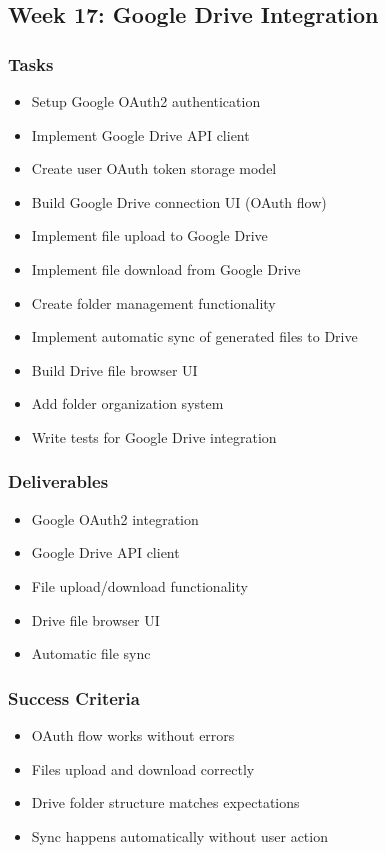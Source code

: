 \documentclass[12pt,oneside]{report}
\begin{document}
\subsection{Week 17: Google Drive Integration}

\subsubsection{Tasks}

\begin{itemize}
    \item Setup Google OAuth2 authentication
    \item Implement Google Drive API client
    \item Create user OAuth token storage model
    \item Build Google Drive connection UI (OAuth flow)
    \item Implement file upload to Google Drive
    \item Implement file download from Google Drive
    \item Create folder management functionality
    \item Implement automatic sync of generated files to Drive
    \item Build Drive file browser UI
    \item Add folder organization system
    \item Write tests for Google Drive integration
\end{itemize}

\subsubsection{Deliverables}

\begin{itemize}
    \item Google OAuth2 integration
    \item Google Drive API client
    \item File upload/download functionality
    \item Drive file browser UI
    \item Automatic file sync
\end{itemize}

\subsubsection{Success Criteria}

\begin{itemize}
    \item OAuth flow works without errors
    \item Files upload and download correctly
    \item Drive folder structure matches expectations
    \item Sync happens automatically without user action
\end{itemize}
\end{document}

